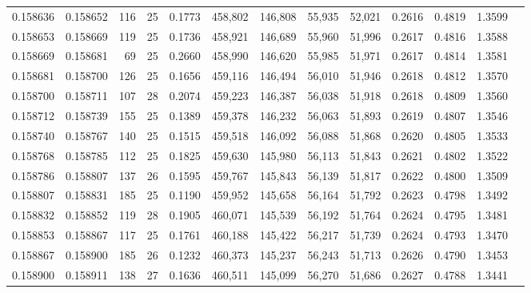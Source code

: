 \begin{tabular}{rrrrrrrrrrrrr}
0.158636 & 0.158652 & 116 &  25 &                                     0.1773 & 458,802 & 146,808 &  55,935 &  52,021 & 0.2616 & 0.4819 & 1.3599 \\
0.158653 & 0.158669 & 119 &  25 &                                     0.1736 & 458,921 & 146,689 &  55,960 &  51,996 & 0.2617 & 0.4816 & 1.3588 \\
0.158669 & 0.158681 &  69 &  25 &                                     0.2660 & 458,990 & 146,620 &  55,985 &  51,971 & 0.2617 & 0.4814 & 1.3581 \\
0.158681 & 0.158700 & 126 &  25 &                                     0.1656 & 459,116 & 146,494 &  56,010 &  51,946 & 0.2618 & 0.4812 & 1.3570 \\
0.158700 & 0.158711 & 107 &  28 &                                     0.2074 & 459,223 & 146,387 &  56,038 &  51,918 & 0.2618 & 0.4809 & 1.3560 \\
0.158712 & 0.158739 & 155 &  25 &                                     0.1389 & 459,378 & 146,232 &  56,063 &  51,893 & 0.2619 & 0.4807 & 1.3546 \\
0.158740 & 0.158767 & 140 &  25 &                                     0.1515 & 459,518 & 146,092 &  56,088 &  51,868 & 0.2620 & 0.4805 & 1.3533 \\
0.158768 & 0.158785 & 112 &  25 &                                     0.1825 & 459,630 & 145,980 &  56,113 &  51,843 & 0.2621 & 0.4802 & 1.3522 \\
0.158786 & 0.158807 & 137 &  26 &                                     0.1595 & 459,767 & 145,843 &  56,139 &  51,817 & 0.2622 & 0.4800 & 1.3509 \\
0.158807 & 0.158831 & 185 &  25 &                                     0.1190 & 459,952 & 145,658 &  56,164 &  51,792 & 0.2623 & 0.4798 & 1.3492 \\
0.158832 & 0.158852 & 119 &  28 &                                     0.1905 & 460,071 & 145,539 &  56,192 &  51,764 & 0.2624 & 0.4795 & 1.3481 \\
0.158853 & 0.158867 & 117 &  25 &                                     0.1761 & 460,188 & 145,422 &  56,217 &  51,739 & 0.2624 & 0.4793 & 1.3470 \\
0.158867 & 0.158900 & 185 &  26 &                                     0.1232 & 460,373 & 145,237 &  56,243 &  51,713 & 0.2626 & 0.4790 & 1.3453 \\
0.158900 & 0.158911 & 138 &  27 &                                     0.1636 & 460,511 & 145,099 &  56,270 &  51,686 & 0.2627 & 0.4788 & 1.3441 \\

\end{tabular}
